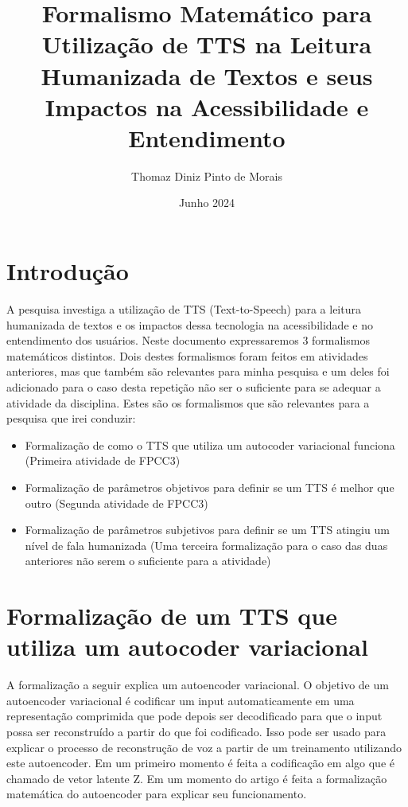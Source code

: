 \documentclass{article}
\begin{document}
\title{Formalismo Matemático para Utilização de TTS na Leitura Humanizada de Textos e seus Impactos na Acessibilidade e Entendimento}
\author{Thomaz Diniz Pinto de Morais}
\date{Junho 2024}
\maketitle

\section{Introdução}

A pesquisa investiga a utilização de TTS (Text-to-Speech) para a leitura humanizada de textos e os impactos dessa tecnologia na acessibilidade e no entendimento dos usuários. Neste documento expressaremos 3 formalismos matemáticos distintos. Dois destes formalismos foram feitos em atividades anteriores, mas que também são relevantes para minha pesquisa e um deles foi adicionado para o caso desta repetição não ser o suficiente para se adequar a atividade da disciplina. Estes são os formalismos que são relevantes para a pesquisa que irei conduzir:


\begin{itemize}
    \item Formalização de como o TTS que utiliza um autocoder variacional funciona (Primeira atividade de FPCC3)
    \item Formalização de parâmetros objetivos para definir se um TTS é melhor que outro (Segunda atividade de FPCC3)
    \item Formalização de parâmetros subjetivos para definir se um TTS atingiu um nível de fala humanizada (Uma terceira formalização para o caso das duas anteriores não serem o suficiente para a atividade)
\end{itemize}

\section{Formalização de um TTS que utiliza um autocoder variacional}

A formalização a seguir explica um autoencoder variacional. O objetivo de um autoencoder variacional é codificar um input automaticamente em uma representação comprimida que pode depois ser decodificado para que o input possa ser reconstruído a partir do que foi codificado. Isso pode ser usado para explicar o processo de reconstrução de voz a partir de um treinamento utilizando este autoencoder. Em um primeiro momento é feita a codificação em algo que é chamado de vetor latente Z. Em um momento do artigo é feita a formalização matemática do autoencoder para explicar seu funcionamento.
\end{document}
